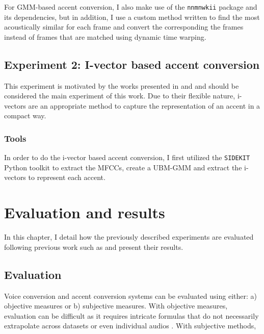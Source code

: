 \documentclass
[
    a4paper,
    twoside,
    12pt,
]
{report}
\begin{document}
For GMM-based accent conversion, I also make use of the
\texttt{nnmnwkii} package and its dependencies, but in addition, I use a
custom method written to find the most acoustically similar for each
frame and convert the corresponding the frames instead of frames that
are matched using dynamic time warping.

\hypertarget{experiment-2-i-vector-based-accent-conversion}{%
\section{Experiment 2: I-vector based accent
conversion}\label{experiment-2-i-vector-based-accent-conversion}}

This experiment is motivated by the works presented in \textcite{wu2016}
and \textcite{kinnunen2017} and should be considered the main experiment
of this work. Due to their flexible nature, i-vectors are an appropriate
method to capture the representation of an accent in a compact way.

\hypertarget{tools-1}{%
\subsection{Tools}\label{tools-1}}

In order to do the i-vector based accent conversion, I first utilized
the \texttt{SIDEKIT} Python toolkit to extract the MFCCs, create a
UBM-GMM and extract the i-vectors to represent each accent.
\cleardoublepage
\chapter{Evaluation and results}

In this chapter, I detail how the previously described experiments are
evaluated following previous work such as \textcite{zhao2018a} and
present their results.

\hypertarget{evaluation}{%
\section{Evaluation}\label{evaluation}}

Voice conversion and accent conversion systems can be evaluated using
either: a) objective measures or b) subjective measures. With objective
measures, evaluation can be difficult as it requires intricate formulas
that do not necessarily extrapolate across datasets or even individual
audios \parencite{felps2010}. With subjective methods,
\end{document}
